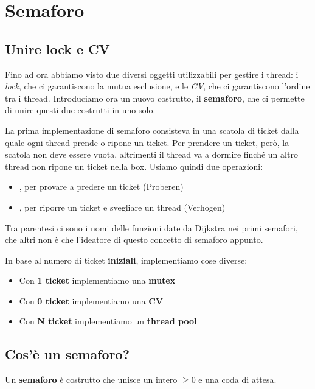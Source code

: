 \documentclass[11pt, a4paper, titlepage, oneside]{scrbook}
\begin{document}
\section{Semaforo}

\subsection{Unire lock e CV}

Fino ad ora abbiamo visto due diversi oggetti utilizzabili per gestire i thread: i \textit{lock}, che ci garantiscono la mutua esclusione, e le \textit{CV}, che ci garantiscono l'ordine tra i thread. Introduciamo ora un nuovo costrutto, il \textbf{semaforo}, che ci permette di unire questi due costrutti in uno solo.

La prima implementazione di semaforo consisteva in una scatola di ticket dalla quale ogni thread prende o ripone un ticket. Per prendere un ticket, però, la scatola non deve essere vuota, altrimenti il thread va a dormire finché un altro thread non ripone un ticket nella box. Usiamo quindi due operazioni:
\begin{itemize}
    \item {}, per provare a predere un ticket (Proberen)
    \item {}, per riporre un ticket e svegliare un thread (Verhogen)
\end{itemize}

\NB Tra parentesi ci sono i nomi delle funzioni date da Dijkstra nei primi semafori, che altri non è che l'ideatore di questo concetto di semaforo appunto.

In base al numero di ticket \textbf{iniziali}, implementiamo cose diverse:
\begin{itemize}
    \item Con \textbf{1 ticket} implementiamo una \textbf{mutex}
    \item Con \textbf{0 ticket} implementiamo una \textbf{CV}
    \item Con \textbf{N ticket} implementiamo un \textbf{thread pool}
\end{itemize}

\subsection{Cos'è un semaforo?}

\begin{Definizione}[Semaforo]
\label{def-semaforo}
Un \textbf{semaforo} è costrutto che unisce un intero $\geq 0$ e una coda di attesa.
\end{Definizione}
\end{document}
